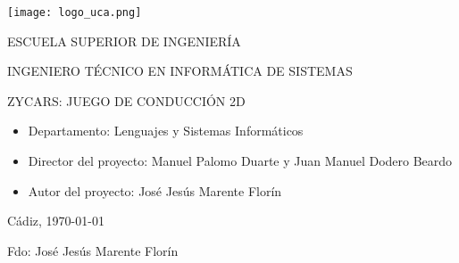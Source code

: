 

\begin{center}

  \texttt{[image: logo\_uca.png]} \\

  \vspace{2.0cm}

  \Large{ESCUELA SUPERIOR DE INGENIERÍA} \\

  \vspace{1.0cm}

  \large{INGENIERO TÉCNICO EN INFORMÁTICA DE SISTEMAS} \\

  \vspace{2.0cm}

  \large{ZYCARS: JUEGO DE CONDUCCIÓN 2D} \\

  \vspace{1.0cm}

\end{center}

\begin{itemize}
\item \large{Departamento: Lenguajes y Sistemas Informáticos}
\item \large{Director del proyecto: Manuel Palomo Duarte y Juan Manuel Dodero Beardo}
\item \large{Autor del proyecto: José Jesús Marente Florín}
\end{itemize}

\vspace{1.0cm}

\begin{flushright}
  \large{Cádiz, \today} \\

  \vspace{2.5cm}

  \large{Fdo: José Jesús Marente Florín}
\end{flushright}
